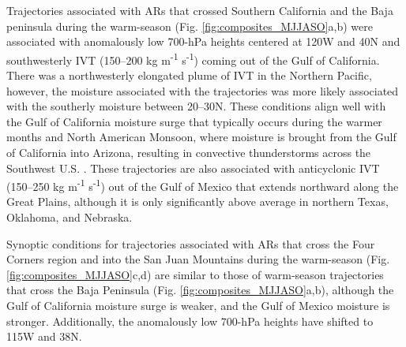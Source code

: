 \documentclass[draft]{agujournal2019}
\begin{document}
Trajectories associated with ARs that crossed Southern California and the Baja peninsula during the warm-season (Fig. \ref{fig:composites_MJJASO}a,b) were associated with anomalously low 700-hPa heights centered at 120\textdegree W and 40\textdegree N and southwesterly IVT (150--200 kg m\textsuperscript{-1} s\textsuperscript{-1}) coming out of the Gulf of California. There was a northwesterly elongated plume of IVT in the Northern Pacific, however, the moisture associated with the trajectories was more likely associated with the southerly moisture between 20--30\textdegree N. These conditions align well with the Gulf of California moisture surge that typically occurs during the warmer months and North American Monsoon, where moisture is brought from the Gulf of California into Arizona, resulting in convective thunderstorms across the Southwest U.S. \cite{Higgins2004RelationshipsStates}. These trajectories are also associated with anticyclonic IVT (150--250 kg m\textsuperscript{-1} s\textsuperscript{-1}) out of the Gulf of Mexico that extends northward along the Great Plains, although it is only significantly above average in northern Texas, Oklahoma, and Nebraska. 

Synoptic conditions for trajectories associated with ARs that cross the Four Corners region and into the San Juan Mountains during the warm-season (Fig. \ref{fig:composites_MJJASO}c,d) are similar to those of warm-season trajectories that cross the Baja Peninsula (Fig. \ref{fig:composites_MJJASO}a,b), although the Gulf of California moisture surge is weaker, and the Gulf of Mexico moisture is stronger. Additionally, the anomalously low 700-hPa heights have shifted to 115\textdegree W and 38\textdegree N. 
\end{document}
